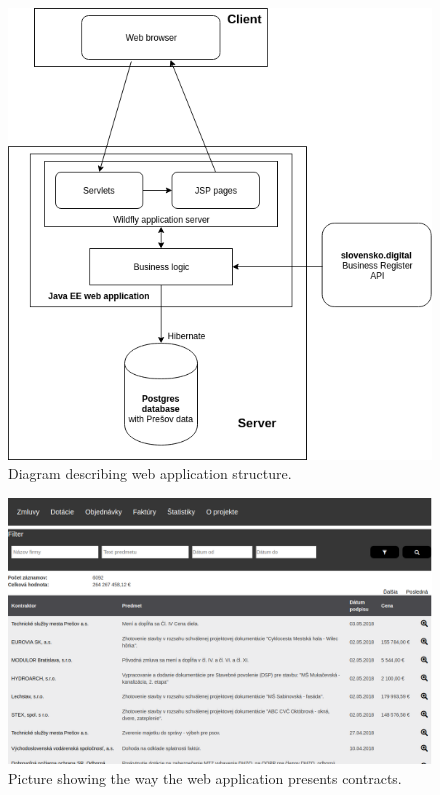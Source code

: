 \documentclass[thesis=B,english]{FITthesis}[2012/06/26]
\begin{document}
{\begin{figure}[H]
  \begin{center}
  \includegraphics[scale=0.65]{pictures/webappDiagram.png}
  \caption{Diagram describing web application structure.}
    \label{fig:webapp}
  \end{center}
\end{figure}

\begin{figure}[H]
  \begin{center}
  \includegraphics[scale=0.30]{pictures/contracts.png}
  \caption{Picture showing the way the web application presents contracts.}
    \label{fig:webapp-contracts}
  \end{center}
\end{figure}

}
\end{document}
